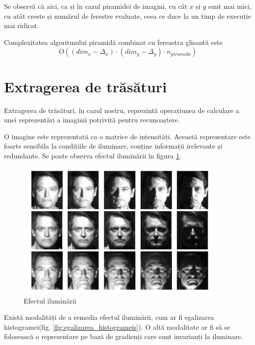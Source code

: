 Se observă că aici, ca și în cazul piramidei de imagini, cu cât $x$ și $y$ sunt mai mici, cu atât creste și numărul de ferestre evaluate, ceea ce duce la un timp de execuție mai ridicat.

Complexitatea algoritmului piramidă combinat cu fereastra glisantă este 
$${O((dim_x-\Delta_x) \cdot (dim_y-\Delta_y) \cdot n_{piramida})}$$

\pagebreak
\section{Extragerea de trăsături}

Extragerea de trăsături, în cazul nostru, reprezintă operațiunea de calculare a unei reprezentări a imaginii potrivită pentru recunoaștere.

O imagine este reprezentată ca o matrice de intensități.
Această reprezentare este foarte sensibila la condițiile de iluminare, conține informații irelevante și redundante.
Se poate observa efectul iluminării în figura \ref{fig:efectul_iluminarii}.

\begin{figure}[H]
	\centering
		\includegraphics[width=0.90\textwidth]{imagini/efectul_iluminarii.png}
	\caption{Efectul iluminării\protect\footnotemark}
	\label{fig:efectul_iluminarii}
\end{figure}


Există modalități de a remedia efectul iluminării, cum ar fi egalizarea histogramei(fig. \ref{fig:egalizarea_histogrameis}).
O altă modalitate ar fi să se folosească o reprezentare pe bază de gradienți care sunt invarianți la iluminare.


